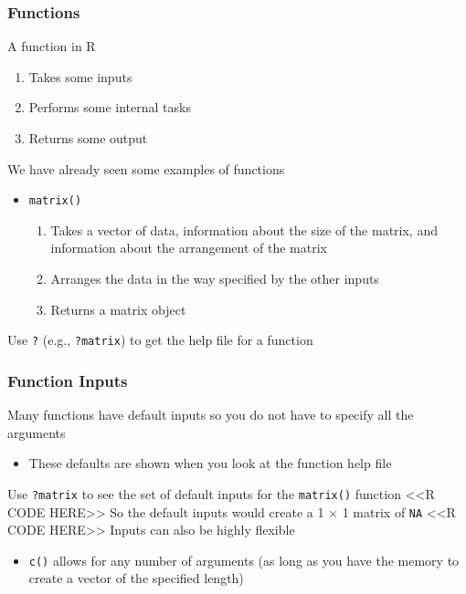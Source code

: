 \documentclass{beamer}
\begin{document}
\begin{frame}\frametitle{Functions}
    A function in R
    \begin{enumerate}
        \item Takes some inputs
        \item Performs some internal tasks
        \item Returns some output
    \end{enumerate}
    \vspace{2ex}
    We have already seen some examples of functions
    \begin{itemize}
        \item \texttt{matrix()}
        \begin{enumerate}
            \item Takes a vector of data, information about the size of the matrix, and information about the arrangement of the matrix
            \item Arranges the data in the way specified by the other inputs
            \item Returns a matrix object
        \end{enumerate}
    \end{itemize}
    \vspace{2ex}
    Use \texttt{?} (e.g., \texttt{?matrix}) to get the help file for a function
\end{frame}

\begin{frame}[fragile]\frametitle{Function Inputs}
    Many functions have default inputs so you do not have to specify all the arguments
    \begin{itemize}
        \item These defaults are shown when you look at the function help file
    \end{itemize}
    \vspace{2ex}
    Use \texttt{?matrix} to see the set of default inputs for the \texttt{matrix()} function
    <<R CODE HERE>>
    \vspace{2ex}
    So the default inputs would create a 1 $\times$ 1 matrix of \texttt{NA}
    <<R CODE HERE>>
    \vspace{2ex}
    Inputs can also be highly flexible
    \begin{itemize}
        \item \texttt{c()} allows for any number of arguments (as long as you have the memory to create a vector of the specified length)
    \end{itemize}
\end{frame}
\end{document}
